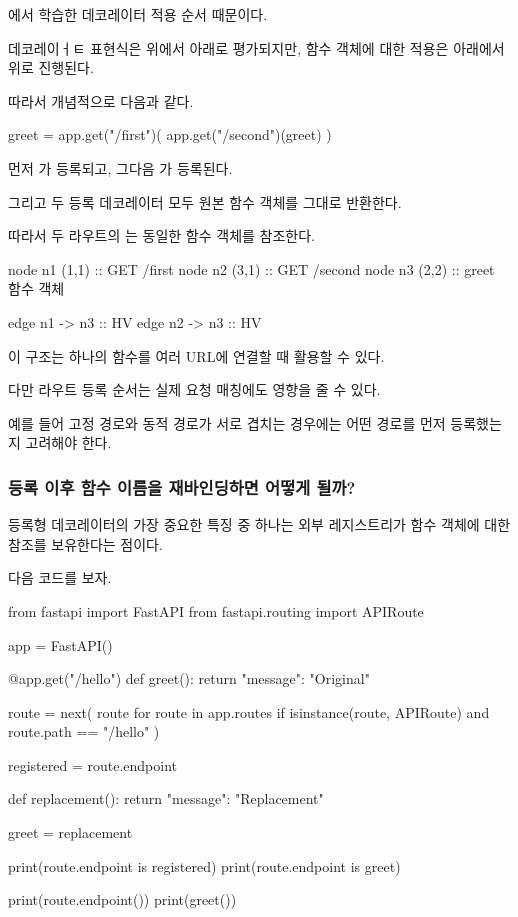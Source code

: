 에서 학습한 데코레이터 적용 순서 때문이다.

데코레이ㅓㅌ 표현식은 위에서 아래로 평가되지만, 함수 객체에 대한 적용은 아래에서 위로 진행된다.

따라서 개념적으로 다음과 같다.

\begin{dhkcode}
greet = app.get("/first")(
    app.get("/second")(greet)
)
\end{dhkcode}

먼저 가 등록되고, 그다음 가 등록된다.

그리고 두 등록 데코레이터 모두 원본 함수 객체를 그대로 반환한다.

따라서 두 라우트의 는 동일한 함수 객체를 참조한다.

\begin{dhkdiagram}[in=6]
node n1 (1,1) :: GET /first
node n2 (3,1) :: GET /second
node n3 (2,2) :: greet 함수 객체

edge n1 -> n3 :: HV
edge n2 -> n3 :: HV
\end{dhkdiagram}

이 구조는 하나의 함수를 여러 URL에 연결할 때 활용할 수 있다.

다만 라우트 등록 순서는 실제 요청 매칭에도 영향을 줄 수 있다.

예를 들어 고정 경로와 동적 경로가 서로 겹치는 경우에는 어떤 경로를 먼저 등록했는지 고려해야 한다.

\subsubsection{등록 이후 함수 이름을 재바인딩하면 어떻게 될까?}

등록형 데코레이터의 가장 중요한 특징 중 하나는 외부 레지스트리가 함수 객체에 대한 참조를 보유한다는 점이다.

다음 코드를 보자.

\begin{dhkcode}
from fastapi import FastAPI
from fastapi.routing import APIRoute


app = FastAPI()


@app.get("/hello")
def greet():
    return {"message": "Original"}


route = next(
    route
    for route in app.routes
    if isinstance(route, APIRoute)
    and route.path == "/hello"
)


registered = route.endpoint


def replacement():
    return {"message": "Replacement"}


greet = replacement


print(route.endpoint is registered)
print(route.endpoint is greet)

print(route.endpoint())
print(greet())
\end{dhkcode}

